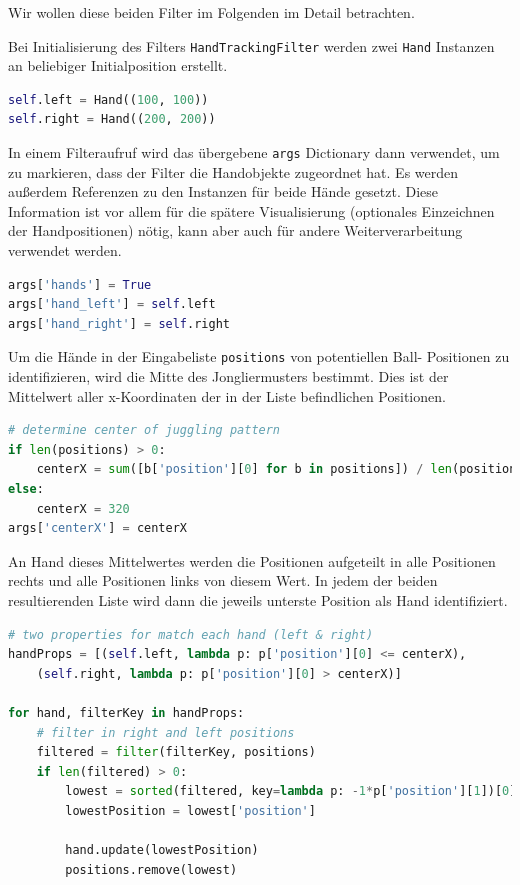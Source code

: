 \documentclass[12pt,a4paper,ngerman]{scrartcl}
\begin{document}
Wir wollen diese beiden Filter im Folgenden im Detail betrachten.

Bei Initialisierung des Filters \lstinline{HandTrackingFilter} werden zwei \lstinline{Hand} Instanzen an beliebiger Initialposition erstellt.

\begin{lstlisting}[language=Python,caption={\lstinline{HandTracking.py}, Ausschnitt}]
self.left = Hand((100, 100))
self.right = Hand((200, 200))
\end{lstlisting}

In einem Filteraufruf wird das übergebene \lstinline{args} Dictionary dann
verwendet, um zu markieren, dass der Filter die Handobjekte zugeordnet hat. Es
werden außerdem Referenzen zu den Instanzen für beide Hände gesetzt. Diese Information ist
vor allem für die spätere Visualisierung (optionales Einzeichnen der Handpositionen)
nötig, kann aber auch für andere Weiterverarbeitung verwendet werden.

\begin{lstlisting}[language=Python,caption={\lstinline{HandTracking.py}, Ausschnitt}]
args['hands'] = True
args['hand_left'] = self.left
args['hand_right'] = self.right
\end{lstlisting}

Um die Hände in der Eingabeliste \lstinline{positions} von potentiellen Ball-
Positionen zu identifizieren, wird
die Mitte des Jongliermusters bestimmt. Dies ist der Mittelwert aller x-Koordinaten
der in der Liste befindlichen Positionen.

\begin{lstlisting}[language=Python,caption={\lstinline{HandTracking.py}, Ausschnitt}]
# determine center of juggling pattern
if len(positions) > 0:
    centerX = sum([b['position'][0] for b in positions]) / len(positions)
else:
    centerX = 320
args['centerX'] = centerX
\end{lstlisting}

An Hand dieses Mittelwertes werden die Positionen aufgeteilt in alle Positionen
rechts und alle Positionen links von diesem Wert. In jedem der beiden resultierenden
Liste wird dann die jeweils unterste Position als Hand identifiziert.

\begin{lstlisting}[language=Python,caption={\lstinline{HandTracking.py}, Ausschnitt}]
# two properties for match each hand (left & right)
handProps = [(self.left, lambda p: p['position'][0] <= centerX),
    (self.right, lambda p: p['position'][0] > centerX)]

for hand, filterKey in handProps:
    # filter in right and left positions
    filtered = filter(filterKey, positions)
    if len(filtered) > 0:
        lowest = sorted(filtered, key=lambda p: -1*p['position'][1])[0]
        lowestPosition = lowest['position']

        hand.update(lowestPosition)
        positions.remove(lowest)
\end{lstlisting}
\end{document}
